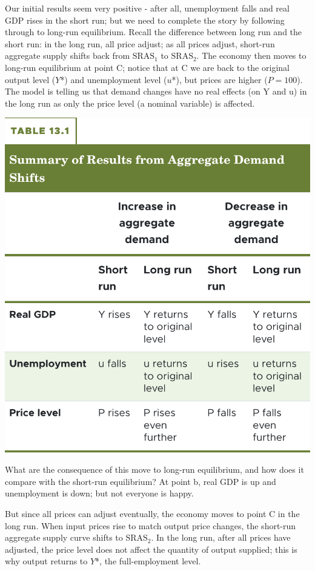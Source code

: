 \documentclass[11pt]{article} %
\begin{document}
Our initial results seem very positive - after all, unemployment falls and real GDP rises in the short run; but we need to complete the story by following through to long-run equilibrium. Recall the difference between long run and the short run: in the long run, all price adjust; as all prices adjust, short-run aggregate supply shifts back from \(\text{SRAS}_1\) to \(\text{SRAS}_2\). The economy then moves to long-run equilibrium at point C; notice that at C we are back to the original output level (\(Y\)*) and unemployment level (\(u\)*), but prices are higher (\(P = 100\)). The model is telling us that demand changes have no real effects (on Y and u) in the long run as only the price level (a nominal variable) is affected.

\begin{center}
\includegraphics[scale=0.5]{images/Table 13.1.png} 
\end{center}

What are the consequence of this move to long-run equilibrium, and how does it compare with the short-run equilibrium? At point b, real GDP is up and unemployment is down; but not everyone is happy.

But since all prices can adjust eventually, the economy moves to point C in the long run. When input prices rise to match output price changes, the short-run aggregate supply curve shifts to \(\text{SRAS}_2\). In the long run, after all prices have adjusted, the price level does not affect the quantity of output supplied; this is why output returns to \(Y\)*, the full-employment level.
\end{document}
